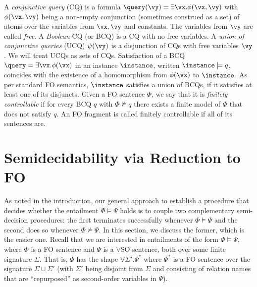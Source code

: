\medskip {}
A {\em conjunctive query} (CQ) %
 is a  formula $\query(\vy) = \exists \vx .\phi(\vx, \vy)$ with $\phi(\vx, \vy)$ being a non-empty conjunction (sometimes construed as a set) of atoms over the variables from $\vx,\vy$ and constants.
 The variables from $\vy$ are called {\em free}. A \emph{Boolean} CQ (or BCQ) is a CQ with no free variables.
 A \emph{union of conjunctive queries} (UCQ) $\psi(\vy)$ is a disjunction of CQs with free variables $\vy$. 
 We will treat UCQs as sets of CQs. %
%
Satisfaction of a BCQ $\query = \exists \vx .\phi(\vx)$ in an instance $\instance$, written $\instance \models q$, coincides with the existence of a homomorphism from $\phi(\vx)$ to $\instance$. As per standard FO semantics, $\instance$ satisfies a union of BCQs, if it satisfies at least one of its disjuncts.
%
Given a FO sentence $\Phi$, we say that it is \emph{finitely controllable} if for every BCQ $q$ with $\Phi \not\models q$ there exists a finite model of $\Phi$ that does not satisfy $q$.
An FO fragment is called finitely controllable if all of its sentences are. 

\section{Semidecidability via Reduction to FO}\label{sec:easy}

As noted in the introduction, our general approach to establish a procedure that decides whether the entailment $\Phi \models \Psi$ holds is to couple two complementary semi-decision procedures: the first terminates successfully whenever $\Phi \models \Psi$ and the second does so whenever $\Phi \not\models \Psi$. In this section, we discuss the former, which is the easier one. Recall that we are interested in entailments of the form $\Phi \models \Psi$, where $\Phi$ is a FO sentence and $\Psi$ is a $\forall$SO sentence, both over some finite signature $\Sigma$. That is, $\Psi$ has the shape $\forall\Sigma'.\Psi^*$ where $\Psi^*$ is a FO sentence over the signature $\Sigma\cup\Sigma'$ 
(with $\Sigma'$ being disjoint from $\Sigma$ and consisting of relation names that are ``repurposed'' as second-order variables in $\Psi$).  

